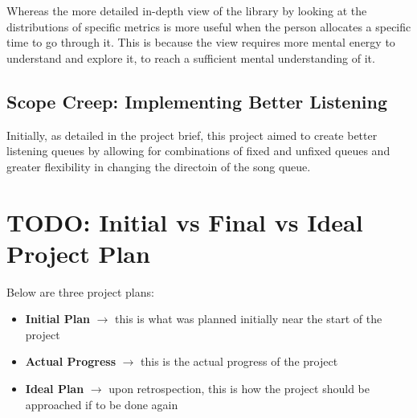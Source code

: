 

Whereas the more detailed in-depth view of the library by looking at the distributions of specific metrics is more useful when the person allocates a specific time to go through it.
This is because the view requires more mental energy to understand and explore it, to reach a sufficient mental understanding of it.

\subsection{Scope Creep: Implementing Better Listening}
Initially, as detailed in the project brief, this project aimed to create better listening queues by allowing for combinations of fixed and unfixed queues and greater flexibility in changing the directoin of the song queue.

\section{TODO: Initial vs Final vs Ideal Project Plan}%
Below are three project plans:\begin{itemize}
    \item \textbf{Initial Plan} \(\to\) this is what was planned initially near the start of the project
    \item \textbf{Actual Progress} \(\to\) this is the actual progress of the project
    \item \textbf{Ideal Plan} \(\to\) upon retrospection, this is how the project should be approached if to be done again
\end{itemize}

